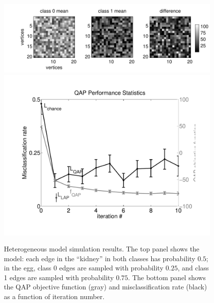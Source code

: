 \documentclass{article} %
\begin{document}
\begin{figure}[htbp]
	\centering			
	\includegraphics[width=1\linewidth]{../figs/hetero_model}
	\includegraphics[width=1\linewidth]{../figs/hetero_performance}
	\caption{Heterogeneous model simulation results. The top panel shows the model: each edge in the ``kidney'' in both classes has probability $0.5$; in the egg, class 0 edges are sampled with probability $0.25$, and class 1 edges are sampled with probability $0.75$. The bottom panel shows the QAP objective function (gray) and misclassification rate (black) as a function of iteration number.  }
	\label{fig:fwpath}
\end{figure}


\end{document}
